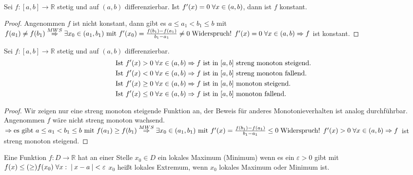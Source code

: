 \documentclass[a4paper,titlepage,oneside]{article}
\def\R{\ensuremath{\mathbb{R}} }
\renewcommand{\epsilon}{\ensuremath{\varepsilon} }
\def\WSP{\text{Widerspruch! }}
\def\sp{\hspace{0,1cm}}
\newcommand{\abs}[1]{\ensuremath{\left|\:#1\:\right|}}
\theoremstyle{thmstyle}
\begin{document}
\begin{korr}
Sei $f : [a,b] \to \R $ stetig und auf $(a,b)$ differenzierbar. Ist $f'(x) = 0 \sp \forall x \in (a,b)$, dann ist $f$ konstant.
\begin{proof}
Angenommen $f$ ist nicht konstant, dann gibt es $a \le a_1 < b_1 \le b$ mit $f(a_1) \ne f(b_1) \overset{MWS}{\Rightarrow} \exists x_0 \in (a_1, b_1) \text{ mit } f'(x_0) = \frac{f(b_1) - f(a_1)}{b_1 - a_1} \ne 0 \sp \WSP f'(x) = 0 \sp \forall x \in (a,b) \Rightarrow f$ ist konstant.
\end{proof}
\end{korr}

\begin{satz}
Sei $f : [a,b] \to \R $ stetig und auf $(a,b)$ differenzierbar.
\begin{align*}\text{Ist } f'(x) > 0 \sp \forall x \in (a,b) &\Rightarrow f \text{ ist in } [a,b] \text{ streng monoton steigend.}\\
\text{Ist } f'(x) < 0 \sp \forall x \in (a,b) &\Rightarrow f \text{ ist in } [a,b] \text{ streng monoton fallend.}\\
\text{Ist } f'(x) \ge 0 \sp \forall x \in (a,b) &\Rightarrow f \text{ ist in } [a,b] \text{ monoton steigend.}\\
\text{Ist } f'(x) \le 0 \sp \forall x \in (a,b) &\Rightarrow f \text{ ist in } [a,b] \text{ monoton fallend.}
\end{align*}
\begin{proof}
Wir zeigen nur eine streng monoton steigende Funktion an, der Beweis für anderes Monotonieverhalten ist analog durchführbar.\\
Angenommen $f$ wäre nicht streng monoton wachsend. $\Rightarrow \text{es gibt } a \le a_1 < b_1 \le b \text{ mit } f(a_1) \ge f(b_1) \overset{MWS}{\Rightarrow} \exists x_0 \in (a_1, b_1) \text{ mit } f'(x) = \frac{f(b_1) - f(a_1)}{b_1 - a_1} \le 0 \sp \WSP f'(x) > 0 \sp \forall x \in (a,b) \Rightarrow f$ ist streng monoton steigend.
\end{proof}
\end{satz}

\begin{defi}
Eine Funktion $f : D \to \R$ hat an einer Stelle $x_0 \in D$ ein lokales Maximum (Minimum) wenn es ein $\epsilon > 0 $ gibt mit $f(x) \le (\ge) f(x_0) \sp \forall x : \sp \abs{x - a} < \epsilon$
$x_0$ heißt lokales Extremum, wenn $x_0$ lokales Maximum oder Minimum ist.
\end{defi}
\end{document}
